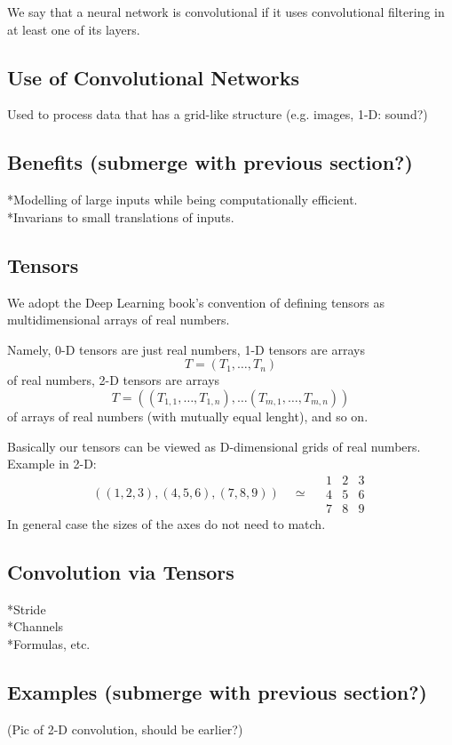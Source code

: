 \documentclass[]{article}
\begin{document}
We say that a neural network is convolutional if it uses convolutional filtering
in at least one of its layers.

\subsection{Use of Convolutional Networks}
Used to process data that has a grid-like structure (e.g. images, 1-D: sound?)

\subsection{Benefits (submerge with previous section?)}
*Modelling of large inputs while being computationally efficient.\\
*Invarians to small translations of inputs.

\subsection{Tensors}
We adopt the Deep Learning book's convention of defining tensors as
multidimensional arrays of real numbers.

Namely, 0-D tensors are just real numbers, 1-D tensors are arrays
\[
T = (T_1, \ldots, T_n)
\]
of real numbers, 2-D tensors are arrays
\[
T = ((T_{1,1}, \ldots, T_{1,n}), \ldots (T_{m,1}, \ldots, T_{m,n}))
\]
of arrays of real numbers (with mutually equal lenght), and so on.

Basically our tensors can be viewed as D-dimensional grids of real numbers.
Example in 2-D:
\[
((1, 2, 3), (4, 5, 6), (7, 8, 9)) \quad \simeq \quad
\begin{array}{c|c|c}
  1 & 2 & 3 \\
  \hline
  4 & 5 & 6 \\
  \hline
  7 & 8 & 9
 \end{array}
\]
In general case the sizes of the axes do not need to match.


\subsection{Convolution via Tensors}
*Stride\\
*Channels\\
*Formulas, etc.

\subsection{Examples (submerge with previous section?)}
(Pic of 2-D convolution, should be earlier?)
\end{document}
